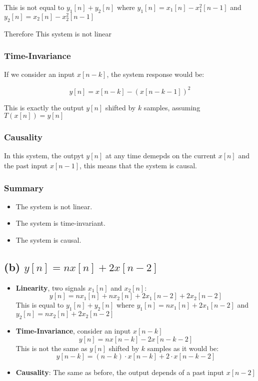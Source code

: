 This is not equal to $y_1[n]+y_2[n]$ where $y_1[n]=x_1[n]-x_1^2[n-1]$ and $y_2[n]=x_2[n]-x_2^2[n-1]$

Therefore This system is not linear

\subsubsection*{Time-Invariance}

If we consider an input $x[n-k]$, the system response would be:

\begin{equation*}
    y[n]=x[n-k]-(x[n-k-1])^2
\end{equation*}

This is exactly the output $y[n]$ shifted by $k$ samples, assuming $T(x[n])=y[n]$

\subsubsection*{Causality}

In this system, the outpyt $y[n]$ at any time demepds on the current $x[n]$ and the past input $x[n-1]$, this means that the system is causal.

\subsubsection*{Summary}
\begin{itemize}
    \item The system is not linear.
    \item The system is time-invariant.
    \item The system is causal.
\end{itemize}

\subsection*{(b) $y[n]=nx[n]+2x[n-2]$}

\begin{itemize}
    \item \textbf{Linearity}, two signals $x_1[n]$ and $x_2[n]$:
    \subitem \begin{equation*} y[n] = nx_{1}[n] + nx_{2}[n] + 2x_{1}[n-2] + 2x_{2}[n-2]
          \end{equation*}
     This is equal to $y_1[n]+y_2[n]$ where $y_1[n]=nx_1[n]+2x_1[n-2]$ and $y_2[n]=nx_2[n]+2x_2[n-2]$

    \item \textbf{Time-Invariance}, consider an input $x[n-k]$
    \subitem \begin{equation*} y[n]= nx[n-k]-2x[n-k-2] \end{equation*}
    This is not the same as $y[n]$ shifted by $k$ samples as it would be:
    \subitem \begin{equation*} y[n-k]=(n-k)\cdot x[n-k]+2 \cdot x[n-k-2] \end{equation*}
    \item \textbf{Causality}: The same as before, the output depends of a past input $x[n-2]$
\end{itemize}

